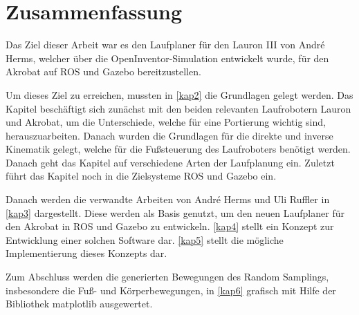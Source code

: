 \chapter{Zusammenfassung}
\label{kap7}

Das Ziel dieser Arbeit war es den Laufplaner für den Lauron III von André Herms, welcher über die OpenInventor-Simulation entwickelt wurde, für den Akrobat auf \ac{ROS} und Gazebo bereitzustellen.

Um dieses Ziel zu erreichen, mussten in \autoref{kap2} die Grundlagen gelegt werden. Das Kapitel beschäftigt sich zunächst mit den beiden relevanten Laufrobotern Lauron und Akrobat, um die Unterschiede, welche für eine  Portierung wichtig sind, herauszuarbeiten. Danach wurden die Grundlagen für die direkte und inverse Kinematik gelegt, welche für die Fußsteuerung des Laufroboters benötigt werden. Danach geht das Kapitel auf verschiedene Arten der Laufplanung ein. Zuletzt führt das Kapitel noch in die Zielsysteme \acf{ROS} und Gazebo ein.

Danach werden die verwandte Arbeiten von André Herms \autocite{herms2004} und Uli Ruffler \autocite{ruffler2006} in \autoref{kap3} dargestellt. Diese werden als Basis genutzt, um den neuen Laufplaner für den Akrobat in \ac{ROS} und Gazebo zu entwickeln. \autoref{kap4} stellt ein Konzept zur Entwicklung einer solchen Software dar. \autoref{kap5} stellt die mögliche Implementierung dieses Konzepts dar.

Zum Abschluss werden die generierten Bewegungen des Random Samplings, insbesondere die Fuß- und Körperbewegungen, in \autoref{kap6} grafisch mit Hilfe der Bibliothek matplotlib ausgewertet.